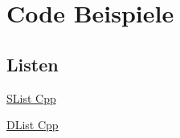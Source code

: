 \newpage
\onecolumn
\section{Code Beispiele}
\subsection{Listen}
\underline{SList Cpp}


\underline{DList Cpp}
